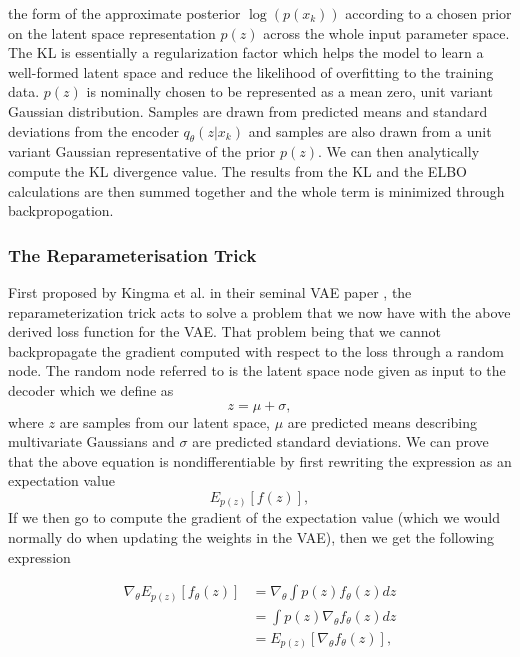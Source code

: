 the form of the approximate posterior $\log(p(x_k))$ according to 
a chosen prior on the latent space representation $p(z)$ across the whole input 
parameter space. The KL is essentially a regularization factor which helps 
the model to learn a well-formed latent space and reduce the likelihood 
of overfitting to the training data. $p(z)$ is nominally chosen to be 
represented as a mean zero, unit variant Gaussian distribution. Samples 
are drawn from predicted means and standard deviations from the 
encoder $q_{\theta}(z|x_k)$ and samples are also drawn from a unit variant 
Gaussian representative of the prior $p(z)$. We can then 
analytically compute the KL divergence value. The results from the KL 
and the ELBO calculations are then summed together and the whole term is 
minimized through backpropogation.

%
%
\subsubsection{The Reparameterisation Trick}

First proposed by Kingma et al. in their seminal \ac{VAE} 
paper \cite{1312.6114}, the reparameterization trick acts to 
solve a problem that we now have with the above derived loss 
function for the \ac{VAE}. That problem being that we cannot 
backpropagate the gradient computed with respect to the loss through 
a random node. The random node referred to is the latent space node 
given as input to the decoder which we define as 
\begin{equation}
    z = \mu + \sigma,\label{eq:before_repar} 
\end{equation}
where $z$ are samples from our latent space, $\mu$ are predicted means 
describing multivariate Gaussians and $\sigma$ are predicted standard deviations. 
We can prove that the above equation is nondifferentiable by first rewriting 
the expression as an expectation value
\begin{equation}
    E_{p(z)}[f(z)],
\end{equation}
If we then go to compute the gradient of the expectation value 
(which we would normally do when updating the weights in the 
\ac{VAE}), then we get the following expression

\begin{align}
    \nabla_{\theta} E_{p(z)}[f_{\theta}(z)] &= \nabla_{\theta} \int p(z) f_{\theta}(z) dz \nonumber \\ 
    &= \int p(z) \nabla_{\theta} f_{\theta}(z) dz\nonumber \\
    &= E_{p(z)}[\nabla_{\theta} f_{\theta}(z)],
\end{align}

